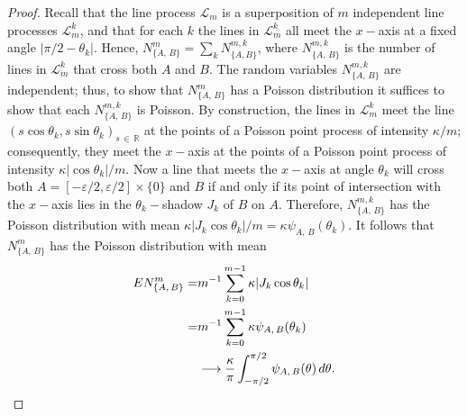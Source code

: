 \documentclass[AHL, Unicode, longabstracts, published]{cedram}
\newcommand{\zz}[1]{\mathbb #1}
\begin{document}
\begin{proof}
Recall that the line process $\mathcal{L}_{m}$ is a superposition of $m$ independent line processes $\mathcal{L}^{k}_{m}$, and that for each $k$ the lines in $\mathcal{L}^{k}_{m}$ all meet the $x-$axis at a fixed angle $|\pi /2-\theta_{k}|$. Hence, $N^{m}_{\{A,\,B\}}=\sum_{k}N^{m,k}_{\{A,B\}}$, where $N^{m,k}_{\{A,\,B\}}$ is the number of lines in $\mathcal{L}^{k}_{m}$ that cross both $A$ and $B$. The random variables $N^{m,k}_{\{A,\,B\}}$ are independent; thus, to show that $N^{m}_{\{A,\,B\}}$ has a Poisson distribution it suffices to show that each $N^{m,k}_{\{A,\,B\}}$ is Poisson. By construction, the lines in $\mathcal{L}^{k}_{m}$ meet the line $(s \cos \theta_{k}, s \sin \theta_{k})_{s\,\in\,\zz{R}}$ at the points of a Poisson point process of intensity $\kappa /m$; consequently, they meet the $x-$axis at the points of a Poisson point process of intensity $\kappa |\cos\theta_{k}|/m$. Now a line that meets the $x-$axis at angle $\theta_{k}$ will cross both $A=[-\varepsilon/2,\varepsilon /2]\times \{0 \}$ and $B$ if and only if its point of intersection with the $x-$axis lies in the $\theta_{k}-$shadow $J_{k}$ of $B$ on $A$. Therefore, $N^{m,k}_{\{A,\,B\}}$ has the Poisson distribution with mean $\kappa |J_{k} \cos \theta_{k}|/m=\kappa \psi_{A,\,B} (\theta_{k})$. It follows that $N^{m}_{\{A,\,B\}}$ has the Poisson distribution with mean
\begin{align*}
EN^{m}_{\{A,\,B\}}=&m^{-1}\sum_{k=0}^{m-1} \kappa|J_{k} \cos \theta_{k}|\\
=&m^{-1}\sum_{k=0}^{m-1} \kappa \psi_{A,\,B} (\theta_{k})\\
&\longrightarrow \frac{\kappa }{\pi } \int_{-\pi /2}^{\pi/2}\psi_{A,\,B} (\theta)\,d\theta.\qedhere
\end{align*}
\end{proof}
\end{document}
